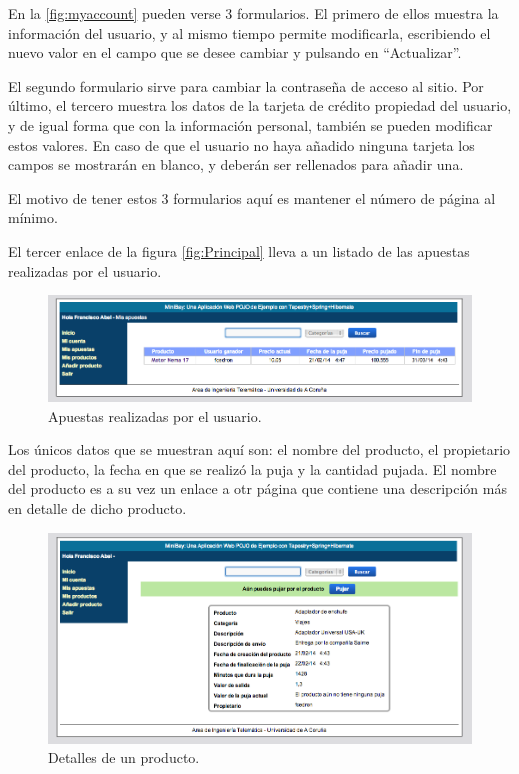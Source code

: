 \documentclass[12pt,a4paper,twoside,spanish]{article}      %
\begin{document}
En la \ref{fig:myaccount} pueden verse 3 formularios. El primero de ellos muestra la información del usuario, y al mismo tiempo
permite modificarla, escribiendo el nuevo valor en el campo que se desee cambiar y pulsando en ``Actualizar''.

El segundo formulario sirve para cambiar la contraseña de acceso al sitio. Por último, el tercero muestra los datos de la 
tarjeta de crédito propiedad del usuario, y de igual forma que con la información personal, también se pueden modificar estos
valores. En caso de que el usuario no haya añadido ninguna tarjeta los campos se mostrarán en blanco, y deberán ser rellenados
para añadir una.

El motivo de tener estos 3 formularios aquí es mantener el número de página al mínimo.

El tercer enlace de la figura \ref{fig:Principal} lleva a un listado de las apuestas realizadas por el usuario.

\begin{figure}[H]
  \centering
    \includegraphics[width=1\textwidth]{mis_apuestas.png}
  \caption{Apuestas realizadas por el usuario.}
  \label{fig:mybids}
\end{figure}

Los únicos datos que se muestran aquí son: el nombre del producto, el propietario del producto, la fecha en que se realizó
la puja y la cantidad pujada. El nombre del producto es a su vez un enlace a otr página que contiene una descripción más en
detalle de dicho producto.

\begin{figure}[H]
  \centering
    \includegraphics[width=1\textwidth]{detalles2.png}
  \caption{Detalles de un producto.}
  \label{fig:productDetails}
\end{figure}
\end{document}
